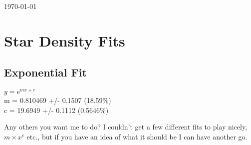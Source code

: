 \documentclass{article}
\begin{document}
\small{\today}
\section{Star Density Fits}
	\subsection{Exponential Fit}
		\begin{minipage}[h]{0.6\textwidth}
				\begin{center}
					\begingroup{}
		  			\resizebox{\textwidth}{!}{%
						
		  			}\endgroup
				\end{center}
		\end{minipage}
		\begin{minipage}[h]{0.35\textwidth}
			$y = \textrm{e}^{mx + c}$ \\
			m               = 0.810469         +/- 0.1507       (18.59\%)\\
			c               = 19.6949          +/- 0.1112       (0.5646\%)\\
		\end{minipage}

		Any others you want me to do? I couldn't get a few different fits to play nicely, $m\times x^{c}$ etc., but if you have an idea of what it should be I can have another go.
\end{document}
